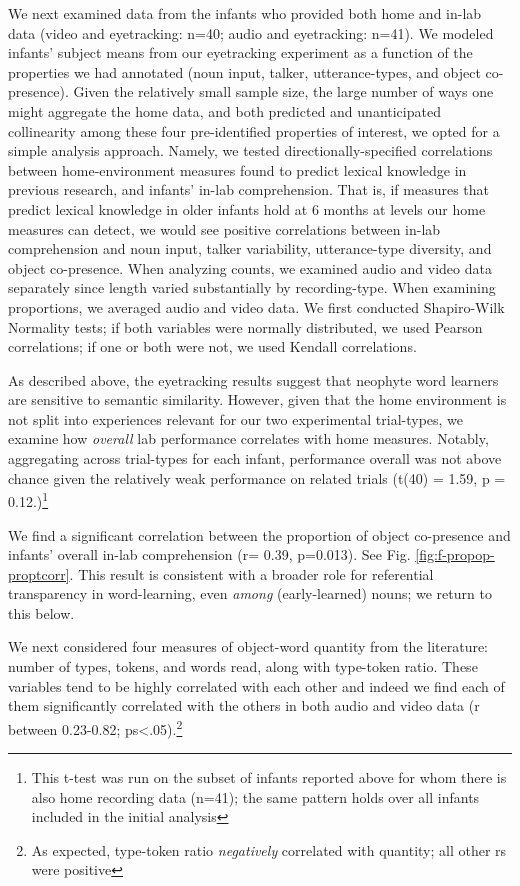\documentclass[9pt,twocolumn,twoside,]{pnas-new}
\begin{document}
We next examined data from the infants who provided both home and in-lab
data (video and eyetracking: n=40; audio and eyetracking: n=41). We
modeled infants' subject means from our eyetracking experiment as a
function of the properties we had annotated (noun input, talker,
utterance-types, and object co-presence). Given the relatively small
sample size, the large number of ways one might aggregate the home data,
and both predicted and unanticipated collinearity among these four
pre-identified properties of interest, we opted for a simple analysis
approach. Namely, we tested directionally-specified correlations between
home-environment measures found to predict lexical knowledge in previous
research, and infants' in-lab comprehension. That is, if measures that
predict lexical knowledge in older infants hold at 6 months at levels
our home measures can detect, we would see positive correlations between
in-lab comprehension and noun input, talker variability, utterance-type
diversity, and object co-presence. When analyzing counts, we examined
audio and video data separately since length varied substantially by
recording-type. When examining proportions, we averaged audio and video
data. We first conducted Shapiro-Wilk Normality tests; if both variables
were normally distributed, we used Pearson correlations; if one or both
were not, we used Kendall correlations.

As described above, the eyetracking results suggest that neophyte word
learners are sensitive to semantic similarity. However, given that the
home environment is not split into experiences relevant for our two
experimental trial-types, we examine how \emph{overall} lab performance
correlates with home measures. Notably, aggregating across trial-types
for each infant, performance overall was not above chance given the
relatively weak performance on related trials (t(40) = 1.59, p =
0.12.)\footnote{This t-test was run on the subset of infants reported
  above for whom there is also home recording data (n=41); the same
  pattern holds over all infants included in the initial analysis}

We find a significant correlation between the proportion of object
co-presence and infants' overall in-lab comprehension (r= 0.39,
p=0.013). See Fig. \ref{fig:f-propop-proptcorr}. This result is
consistent with a broader role for referential transparency in
word-learning, even \emph{among} (early-learned) nouns; we return to
this below.

We next considered four measures of object-word quantity from the
literature: number of types, tokens, and words read, along with
type-token ratio. These variables tend to be highly correlated with each
other and indeed we find each of them significantly correlated with the
others in both audio and video data (\textbar{}r\textbar{} between
0.23-0.82; ps\textless{}.05).\footnote{As expected, type-token ratio
  \emph{negatively} correlated with quantity; all other rs were positive}
\end{document}
